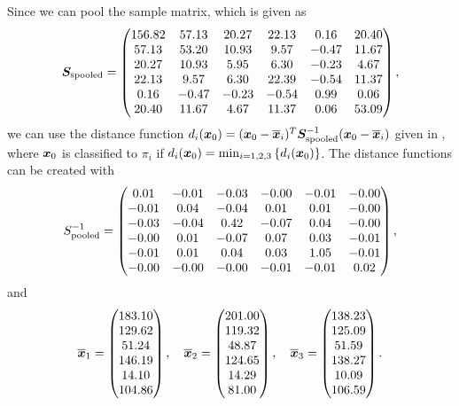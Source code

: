 Since we can pool the sample matrix, which is given as
\begin{equation*}
  \bm{S}_{\rm spooled} =
  \begin{pmatrix}
    156.82 &57.13 &20.27 &22.13 &0.16 &20.40 \\ 
    57.13 &53.20 &10.93 &9.57 &-0.47 &11.67 \\ 
    20.27 &10.93 &5.95 &6.30 &-0.23 &4.67 \\ 
    22.13 &9.57 &6.30 &22.39 &-0.54 &11.37 \\ 
    0.16 &-0.47 &-0.23 &-0.54 &0.99 &0.06 \\ 
    20.40 &11.67 &4.67 &11.37 &0.06 &53.09 
  \end{pmatrix},
\end{equation*}
we can use the distance function $d_{i}(\bm{x}_{0}) = (\bm{x}_{0} - \overline{\bm{x}}_{i})^{T} \bm{S}_{\rm spooled}^{-1} (\bm{x}_{0} - \overline{\bm{x}}_{i})$ given in \cite[p. 611]{book}, where  $\bm{x}_{0}$ is classified to
$\pi_{i}$ if $d_{i}(\bm{x}_{0}) = \min_{i = 1, 2, 3}
\left\{
    d_{i}(\bm{x}_{0})
\right\}$. The distance functions can be created with
\begin{equation*}
  S_{\rm pooled}^{-1} =
  \begin{pmatrix}
    0.01 &-0.01 &-0.03 &-0.00 &-0.01 &-0.00 \\ 
    -0.01 &0.04 &-0.04 &0.01 &0.01 &-0.00 \\ 
    -0.03 &-0.04 &0.42 &-0.07 &0.04 &-0.00 \\ 
    -0.00 &0.01 &-0.07 &0.07 &0.03 &-0.01 \\ 
    -0.01 &0.01 &0.04 &0.03 &1.05 &-0.01 \\ 
    -0.00 &-0.00 &-0.00 &-0.01 &-0.01 &0.02  
  \end{pmatrix},
\end{equation*}
and 
\begin{equation*}
  \overline{\bm{x}}_{1} =
  \begin{pmatrix}
    183.10 \\ 
    129.62 \\ 
    51.24 \\ 
    146.19 \\ 
    14.10 \\ 
    104.86 
  \end{pmatrix}, \quad 
  \overline{\bm{x}}_{2} =
  \begin{pmatrix}
    201.00 \\ 
    119.32 \\ 
    48.87 \\ 
    124.65 \\ 
    14.29 \\ 
    81.00  
  \end{pmatrix}, \quad 
  \overline{\bm{x}}_{3} =
  \begin{pmatrix}
    138.23 \\ 
    125.09 \\ 
    51.59 \\ 
    138.27 \\ 
    10.09 \\ 
    106.59
  \end{pmatrix}.
\end{equation*}



